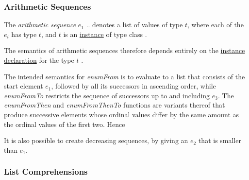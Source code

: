 \subsubsection{Arithmetic Sequences}  
\label{aseq}

The \emph{arithmetic sequence} \bracka{}$e_1$  .. \brackz{} 
denotes a list of values of type $t$, 
where each of the $e_i$ has type $t$, and $t$ is an \hyperref[instance]{instance} of type class .


The semantics of arithmetic sequences therefore depends entirely on the \hyperref[instdcl]{instance declaration}
for the type $t$ .

The intended semantics for \emph{enumFrom} is to evaluate to a list that consists of the start element $e_1$, followed by all its successors in ascending order, while \emph{enumFromTo} restricts the sequence of successors up to and including $e_3$. The \emph{enumFromThen} and \emph{enumFromThenTo} functions are variants thereof that produce successive elements whose ordinal values differ by the same amount as the ordinal values of the first two. Hence


It is also possible to create decreasing sequences, by giving an $e_2$ that is smaller than $e_1$.


\subsubsection{List Comprehensions}  


